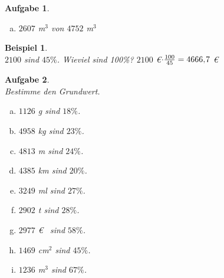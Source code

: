 \documentclass[12pt]{article}
\theoremstyle{aufg}
\newtheorem{aufgabe}{Aufgabe}
\theoremstyle{bsp}
\newtheorem{beispiel}{Beispiel}
\begin{document}
\begin{flushleft}
\begin{aufgabe}
\begin{multicols}{3}
\begin{enumerate}[a)]
$958$ cm$^2$ von $3823$ cm$^2$
\item 
$2607$ m$^3$ von $4752$ m$^3$
\end{enumerate} 
\end{multicols} 
\end{aufgabe} 
\begin{beispiel} ~ \\ 
$2100$ sind $45\%$. Wieviel sind 100\%? $2100$ \euro$\cdot \frac{100}{45}= 4666,\hspace{-1pt}7$ \euro\end{beispiel} 
\begin{aufgabe} ~ \\ 
Bestimme den Grundwert.\begin{multicols}{3} 
\begin{enumerate}[a)] 
\item 
$1126$ g sind $18\%$.
\item 
$4958$ kg sind $23\%$.
\item 
$4813$ m sind $24\%$.
\item 
$4385$ km sind $20\%$.
\item 
$3249$ ml sind $27\%$.
\item 
$2902$ t sind $28\%$.
\item 
$2977$ \euro~ sind $58\%$.
\item 
$1469$ cm$^2$ sind $45\%$.
\item 
$1236$ m$^3$ sind $67\%$.
\end{enumerate} 
\end{multicols} 
\end{aufgabe} 

\end{flushleft}
\end{document}
